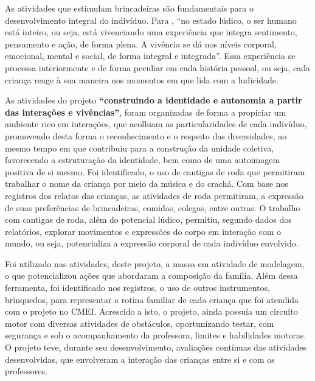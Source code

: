 \begin{refsection}
    As atividades que estimulam brincadeiras são fundamentais para o desenvolvimento integral do indivíduo. Para \textcite[p.~25]{LUCKESI2004Estados}, “no estado lúdico, o ser humano está inteiro, ou seja, está vivenciando uma experiência que integra sentimento, pensamento e ação, de forma plena. A vivência se dá nos níveis corporal, emocional, mental e social, de forma integral e integrada”. Essa experiência se processa interiormente e de forma peculiar em cada história pessoal, ou seja, cada criança reage à sua maneira nos momentos em que lida com a ludicidade.  

    As atividades do projeto \textbf{“construindo a identidade e autonomia a partir das interações e vivências”}, foram organizadas de forma a propiciar um ambiente rico em interações, que acolhiam as particularidades de cada indivíduo, promovendo desta forma o reconhecimento e o respeito das diversidades, ao mesmo tempo em que contribuiu para a construção da unidade coletiva, favorecendo a estruturação da identidade, bem como de uma autoimagem positiva de si mesmo. Foi identificado, o uso de cantigas de roda que permitiram trabalhar o nome da criança por meio da música e do crachá. Com base nos registros dos relatos das crianças, as atividades de roda permitiram, a expressão de suas preferências de brincadeiras, comidas, colegas, entre outras. O trabalho com cantigas de roda, além do potencial lúdico, permitiu, segundo dados dos relatórios, explorar movimentos e expressões do corpo em interação com o mundo, ou seja, potencializa a expressão corporal de cada indivíduo envolvido.  

    Foi utilizado nas atividades, deste projeto, a massa em atividade de modelagem, o que potencializou ações que abordaram a composição da família. Além dessa ferramenta, foi identificado nos registros, o uso de outros instrumentos, brinquedos, para representar a rotina familiar de cada criança que foi atendida com o projeto no CMEI. Acrescido a isto, o projeto, ainda possuía um circuito motor com diversas atividades de obstáculos, oportunizando testar, com segurança e sob o acompanhamento da professora, limites e habilidades motoras. O projeto teve, durante seu desenvolvimento, avaliações contínuas das atividades desenvolvidas, que envolveram a interação das crianças entre si e com os professores. 


\end{refsection}
